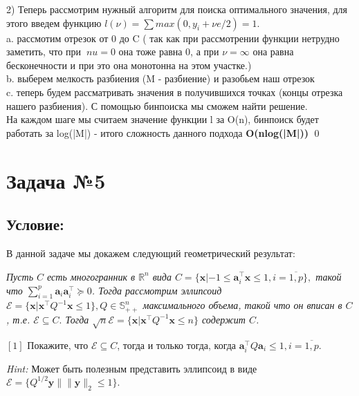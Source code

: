 \documentclass[a4paper,12pt]{article}
\begin{document}
2) Теперь рассмотрим нужный алгоритм для поиска оптимального значения, для этого введем функцию $l(\nu ) = \sum max(0, y_i + \nu e/2) = 1$. \\
a. рассмотим отрезок от 0 до C ( так как при рассмотрении функции нетрудно заметить, что при $\
nu = 0$ она тоже равна 0, а при $\nu = \infty$ она равна бесконечности и при это она монотонна на этом участке.)\\
b. выберем мелкость разбиения (M - разбиение) и разобьем наш отрезок \\
c. теперь будем рассматривать значения в получившихся точках (концы отрезка нашего разбиения). С помощью бинпоиска мы сможем найти решение. \\
На каждом шаге мы считаем значение функции l за O(n), бинпоиск будет работать за log(|M|) - итого сложность данного подхода \textbf{O(nlog(|M|))} \qed

\newpage

\section*{Задача №5}
\subsection*{Условие:}

В данной задаче мы докажем следующий геометрический результат:

\textit{ Пусть $C$ есть многогранник в $\mathbb{R}^n$ вида $C=\{\mathbf{x}| -1\leq \mathbf{a}_i^\top \mathbf{x}\leq 1, i=\overline{1,p}\},$ такой что $\sum\limits_{i=1}^p \mathbf{a}_i \mathbf{a}_i^\top \succeq 0$. Тогда рассмотрим эллипсоид $\mathcal{E}=\{\mathbf{x}| \mathbf{x}^\top Q^{-1} \mathbf{x}\leq 1\}, Q\in\mathbb{S}^n_{++}$ максимального объема, такой что он вписан в $C$, т.е. $\mathcal{E}\subseteq C.$ Тогда $\sqrt{n} \mathcal{E}=\{\mathbf{x}| \mathbf{x}^\top Q^{-1} \mathbf{x}\leq n\}$ содержит $C$.}

\item \label{Q_cond} $[1]$ Покажите, что $\mathcal{E}\subseteq C$, тогда и только тогда, когда  $\mathbf{a}_i^\top Q \mathbf{a}_i \leq 1, i=\overline{1,p}.$

\textit{Hint:} Может быть полезным представить эллипсоид в виде $\mathcal{E}=\{Q^{1/2} \mathbf{y}\| \|\mathbf{y}\|_2\leq 1\}.$
\end{document}
